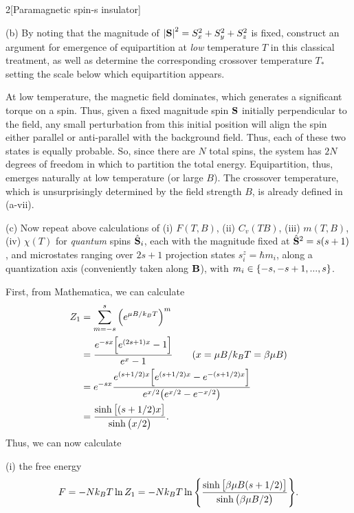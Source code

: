\documentclass[12pt]{article}
\begin{document}
\begin{problem}{2}[Paramagnetic spin-s insulator]
\begin{solution}
\end{solution}

(b) By noting that the magnitude of $\abs{\vb{S}}^2=S_x^2+S_y^2+S_z^2$ is fixed,
construct an argument for emergence of equipartition at \textit{low} temperature
$T$ in this classical treatment, as well as determine the corresponding
crossover temperature $T_\ast$ setting the scale below which equipartition
appears.

\begin{solution}
At low temperature, the magnetic field dominates, which generates a significant
torque on a spin. Thus, given a fixed magnitude spin $\vb{S}$ initially 
perpendicular to the field, any small perturbation from
this initial position will align the spin either parallel or anti-parallel with
the background field. Thus, each of these two states is equally probable. So, 
since there are $N$ total spins, the system has $2N$ degrees of freedom in 
which to partition the total energy. Equipartition, thus, emerges naturally at 
low temperature (or large $B$). The crossover temperature, which is
unsurprisingly determined by the field strength $B$, is already defined in
(a-vii).
\end{solution}

(c) Now repeat above calculations of (i) $F(T,B)$, (ii) $C_v(TB)$, (iii)
$m(T,B)$, (iv) $\chi(T)$ for \textit{quantum} spins $\hat{\vb{S}}_i$, each with
the magnitude fixed at $\hat{\vb{S}}^2=s(s+1)$, and microstates ranging over
$2s+1$ projection states $s_i^z=\hbar m_i$, along a quantization axis
(conveniently taken along $\vb{B}$), with $m_i\in\qty{-s,-s+1,...,s}$.
\begin{solution}

First, from Mathematica, we can calculate
\begin{align}
    Z_1
    &=\sum_{m=-s}^s\qty(e^{\mu B/k_BT})^m \notag\\
    &=\frac{e^{-sx}\qty[e^{(2s+1)x}-1]}{e^{x}-1}\tag{$x=\mu B/k_BT=\beta\mu B$}\\
    &=e^{-sx}\frac{e^{(s+1/2)x}\qty[e^{(s+1/2)x}-e^{-(s+1/2)x}]}{e^{x/2}\qty(e^{x/2}-e^{-x/2})}\notag\\
    &=\frac{\sinh\qty[(s+1/2)x]}{\sinh\qty(x/2)}.
\end{align}
Thus, we can now calculate

(i) the free energy
\begin{equation}\label{p2c:F}
    F=-Nk_BT\ln Z_1 
    =-Nk_BT\ln\qty{\frac{\sinh\qty[\beta\mu B(s+1/2)]}{\sinh\qty(\beta\mu
    B/2)}}.
\end{equation}


\end{solution}
\end{problem}
\end{document}
